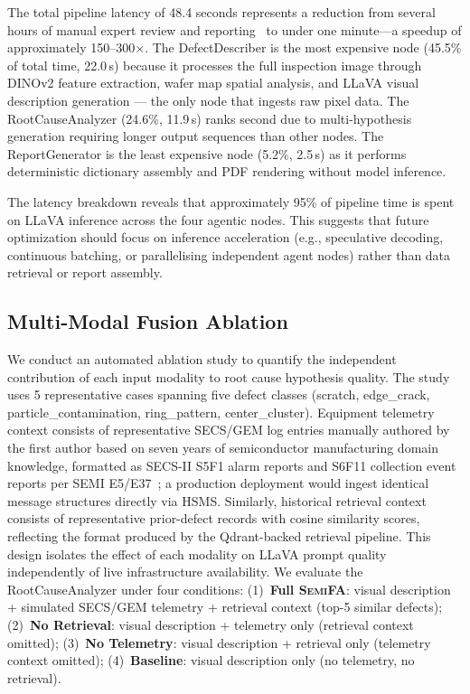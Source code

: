 \documentclass[conference]{IEEEtran}
\newcommand{\semifa}{\textsc{SemiFA}}
\begin{document}
The total pipeline latency of 48.4 seconds represents a reduction from several hours of manual expert review and reporting~\cite{kla2023klarity,amat2023actionable} to under one minute---a speedup of approximately 150--300$\times$.
The DefectDescriber is the most expensive node (45.5\% of total time, 22.0\,s) because it processes the full inspection image through DINOv2 feature extraction, wafer map spatial analysis, and LLaVA visual description generation --- the only node that ingests raw pixel data.
The RootCauseAnalyzer (24.6\%, 11.9\,s) ranks second due to multi-hypothesis generation requiring longer output sequences than other nodes.
The ReportGenerator is the least expensive node (5.2\%, 2.5\,s) as it performs deterministic dictionary assembly and PDF rendering without model inference.

The latency breakdown reveals that approximately 95\% of pipeline time is spent on LLaVA inference across the four agentic nodes.
This suggests that future optimization should focus on inference acceleration (e.g., speculative decoding, continuous batching, or parallelising independent agent nodes) rather than data retrieval or report assembly.

\subsection{Multi-Modal Fusion Ablation}

We conduct an automated ablation study to quantify the independent contribution of each input modality to root cause hypothesis quality.
The study uses 5 representative cases spanning five defect classes (scratch, edge\_crack, particle\_contamination, ring\_pattern, center\_cluster).
Equipment telemetry context consists of representative SECS/GEM log entries manually authored by the first author based on seven years of semiconductor manufacturing domain knowledge, formatted as SECS-II S5F1 alarm reports and S6F11 collection event reports per SEMI E5/E37~\cite{semi_e5,semi_e37}; a production deployment would ingest identical message structures directly via HSMS.
Similarly, historical retrieval context consists of representative prior-defect records with cosine similarity scores, reflecting the format produced by the Qdrant-backed retrieval pipeline.
This design isolates the effect of each modality on LLaVA prompt quality independently of live infrastructure availability.
We evaluate the RootCauseAnalyzer under four conditions:
(1)~\textbf{Full \semifa{}}: visual description + simulated SECS/GEM telemetry + retrieval context (top-5 similar defects);
(2)~\textbf{No Retrieval}: visual description + telemetry only (retrieval context omitted);
(3)~\textbf{No Telemetry}: visual description + retrieval only (telemetry context omitted);
(4)~\textbf{Baseline}: visual description only (no telemetry, no retrieval).
\end{document}
